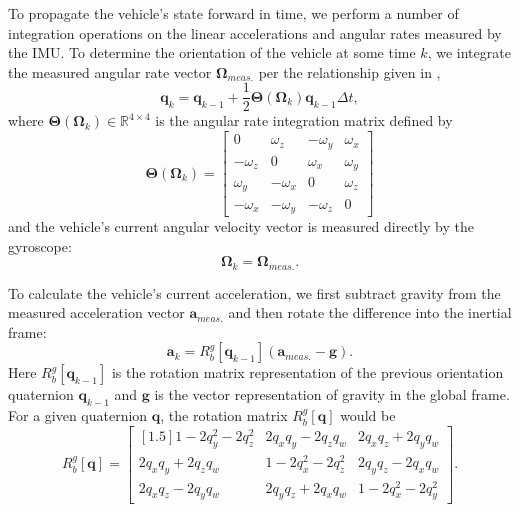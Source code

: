To propagate the vehicle's state forward in time, we perform a number of integration operations on the linear accelerations and angular rates measured by the IMU. To determine the orientation of the vehicle at some time $k$, we integrate the measured angular rate vector $\bm{\Omega}_{meas.}$ per the relationship given in \cite{Stevens2015},
%
\begin{equation} \label{eq:proc_quat}
\mathbf{q}_{k} = \mathbf{q}_{k-1} + \frac{1}{2} \mathbf{\Theta} \left( \bm{\Omega}_{k} \right) \mathbf{q}_{k-1} \Delta t ,
\end{equation}
%
where $\mathbf{\Theta} \left( \bm{\Omega}_{k} \right) \in \mathbb{R}^{4 \times 4}$ is the angular rate integration matrix defined by
%
\begin{equation}
\mathbf{\Theta} \left( \bm{\Omega}_{k} \right) =
\begin{bmatrix}
0 & \omega_{z} & -\omega_{y} & \omega_{x} \\
-\omega_{z} & 0 & \omega_{x} & \omega_{y} \\
\omega_{y} & -\omega_{x} & 0 & \omega_{z} \\
-\omega_{x} & -\omega_{y} & -\omega_{z} & 0
\end{bmatrix}
\end{equation}
%
and the vehicle's current angular velocity vector is measured directly by the gyroscope:
%
\begin{equation} \label{eq:proc_ang_vel}
\bm{\Omega}_{k} = \bm{\Omega}_{meas.} .
\end{equation}

To calculate the vehicle's current acceleration, we first subtract gravity from the measured acceleration vector $\mathbf{a}_{meas.}$ and then rotate the difference into the inertial frame:
%
\begin{equation} \label{eq:proc_acc}
\mathbf{a}_{k} = R^{g}_{b} \left[ \mathbf{q}_{k-1} \right] \left( \mathbf{a}_{meas.} - \mathbf{g} \right) .
\end{equation}
%
Here $R^{g}_{b} \left[ \mathbf{q}_{k-1} \right]$ is the rotation matrix representation of the previous orientation quaternion $\mathbf{q}_{k-1}$ and $\mathbf{g}$ is the vector representation of gravity in the global frame. For a given quaternion $\mathbf{q}$, the rotation matrix $R^{g}_{b} \left[ \mathbf{q} \right]$ would be
%
\begin{equation}
R^{g}_{b} \left[ \mathbf{q} \right] =
\begin{bmatrix}[1.5]
    1 - 2 q_{y}^2 - 2 q_{z}^2 & 2 q_{x} q_{y} - 2 q_{z} q_{w} & 2 q_{x} q_{z} + 2 q_{y} q_{w} \\
    2 q_{x} q_{y} + 2 q_{z} q_{w} & 1 - 2 q_{x}^2 - 2 q_{z}^2 & 2 q_{y} q_{z} - 2 q_{x} q_{w} \\
    2 q_{x} q_{z} - 2 q_{y} q_{w} & 2 q_{y} q_{z} + 2 q_{x} q_{w} & 1 - 2 q_{x}^2 - 2 q_{y}^2
\end{bmatrix} .
\end{equation}

